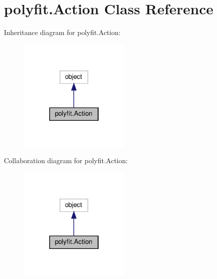 \hypertarget{classpolyfit_1_1Action}{}\section{polyfit.\+Action Class Reference}
\label{classpolyfit_1_1Action}


Inheritance diagram for polyfit.\+Action\+:
\nopagebreak
\begin{figure}[H]
\begin{center}
\leavevmode
\includegraphics[width=154pt]{classpolyfit_1_1Action__inherit__graph}
\end{center}
\end{figure}


Collaboration diagram for polyfit.\+Action\+:
\nopagebreak
\begin{figure}[H]
\begin{center}
\leavevmode
\includegraphics[width=154pt]{classpolyfit_1_1Action__coll__graph}
\end{center}
\end{figure}
